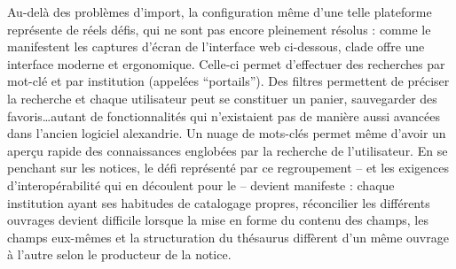 Au-delà des problèmes d'import, la configuration même d'une telle plateforme représente de réels défis, qui ne sont pas encore pleinement résolus : comme le manifestent les captures d'écran de l'interface web ci-dessous, \gls{clade} offre une interface moderne et ergonomique. Celle-ci permet d'effectuer des recherches par mot-clé et par institution (appelées \enquote{portails}). Des filtres permettent de préciser la recherche et chaque utilisateur peut se constituer un panier, sauvegarder des favoris\dots autant de fonctionnalités qui n'existaient pas de manière aussi avancées dans l'ancien logiciel \gls{alexandrie}. Un nuage de mots-clés permet même d'avoir un aperçu rapide des connaissances englobées par la recherche de l'utilisateur. En se penchant sur les notices, le défi représenté par ce regroupement -- et les exigences d'interopérabilité qui en découlent pour le \mae -- devient manifeste : chaque institution ayant ses habitudes de catalogage propres, réconcilier les différents ouvrages devient difficile lorsque la mise en forme du contenu des champs, les champs eux-mêmes et la structuration du thésaurus diffèrent d'un même ouvrage à l'autre selon le producteur de la notice.


